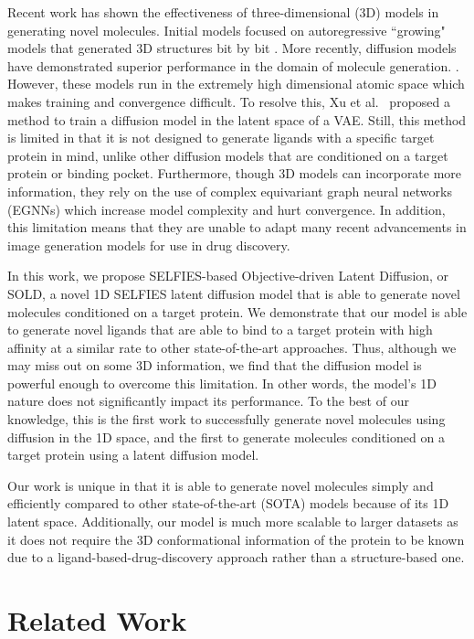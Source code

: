 \documentclass[11pt]{article}
\begin{document}
Recent work has shown the effectiveness of three-dimensional (3D) models in generating 
novel molecules. Initial models focused on autoregressive ``growing"
models that generated 3D structures bit by bit \cite{gebauer20}. 
More recently, diffusion models have demonstrated superior performance 
in the domain of molecule generation. \cite{hoogeboom22}\cite{vignac2023midimixedgraph3d}\cite{schneuing2023}.
However, these models run in the
extremely high dimensional atomic space which makes training and 
convergence difficult. To resolve this, Xu et al. \cite{xu2023geometriclatentdiffusionmodels} proposed a 
method to train a diffusion model in the latent space of a VAE.
Still, this method is limited in that it is not designed to generate
ligands with a specific target protein in mind, unlike other
diffusion models that are conditioned on a target protein or binding
pocket. Furthermore, though 3D models can incorporate more information, they
rely on the use of complex equivariant graph neural networks (EGNNs)
which increase model complexity and hurt convergence. In addition, 
this limitation means that they are unable to adapt many recent
advancements in image generation models for use in drug discovery.

In this work, we propose SELFIES-based Objective-driven Latent Diffusion, or SOLD,
a novel 1D SELFIES latent diffusion model
that is able to generate novel molecules conditioned on a target
protein. We demonstrate that our model is able to generate novel ligands 
that are able to bind to a target protein with high affinity at a 
similar rate to other state-of-the-art approaches. Thus, although we may 
miss out on some 3D information, we find that the diffusion model is powerful 
enough to overcome this limitation. In other words, the model's 1D nature 
does not significantly impact its performance. 
To the best of our knowledge, this is the first work to successfully generate novel molecules 
using diffusion in the 1D space, and the first to generate
molecules conditioned on a target protein using a latent diffusion 
model.

Our work is unique in that it is able to generate novel molecules 
simply and efficiently compared to other state-of-the-art (SOTA) models because of its 1D latent space. 
Additionally, our model is much more scalable to larger datasets as it does not require the 
3D conformational 
information of the protein to be known due to 
a ligand-based-drug-discovery approach rather than a structure-based 
one.

\section{Related Work}
\end{document}
